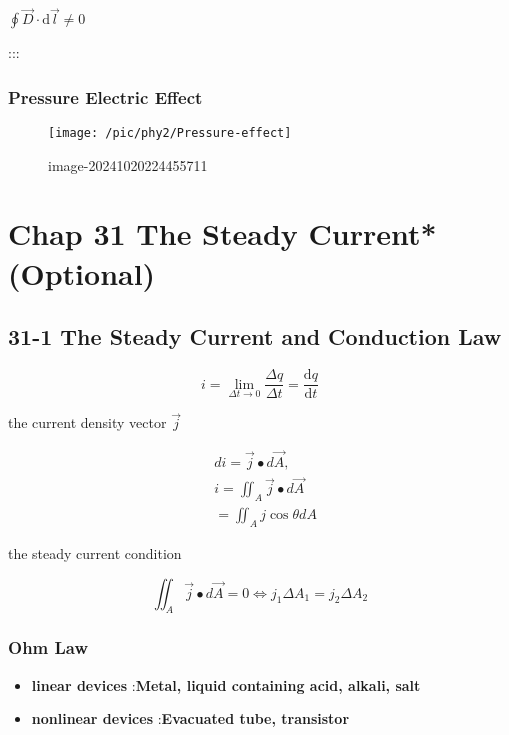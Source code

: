 \documentclass[
]{article}
\providecommand{\tightlist}{%
  \setlength{\itemsep}{0pt}\setlength{\parskip}{0pt}}
\begin{document}
\(\displaystyle \oint \vec D\cdot \mathrm d\vec l\neq 0\)

:::

\hypertarget{pressure-electric-effect}{%
\subsubsection{Pressure Electric
Effect}\label{pressure-electric-effect}}

\begin{figure}
\centering
\texttt{[image: /pic/phy2/Pressure-effect]}
\caption{image-20241020224455711}
\end{figure}

\hypertarget{chap-31-the-steady-currentoptional}{%
\section{Chap 31 The Steady
Current*(Optional)}\label{chap-31-the-steady-currentoptional}}

\hypertarget{the-steady-current-and-conduction-law}{%
\subsection{31-1 The Steady Current and Conduction
Law}\label{the-steady-current-and-conduction-law}}

\[
i=\lim _{\Delta t\to 0}\frac{\Delta q}{\Delta t}=\frac{\mathrm d q}{\mathrm d t}
\]

the current density vector \(\vec j\)

\[
\begin{aligned}&di=\vec{j}\bullet d\vec{A},\\&i=\iint_A\vec{j}\bullet d\vec{A}\\&=\iint_Aj\cos\theta dA\end{aligned}
\]

the steady current condition

\[
\iint_A\vec{j}\bullet d\vec{A}=0\Leftrightarrow j_1\Delta A_1=j_2\Delta A_2
\]

\hypertarget{ohm-law}{%
\subsubsection{Ohm Law}\label{ohm-law}}

\begin{itemize}
\tightlist
\item
  \textbf{linear devices} :\textbf{Metal, liquid containing acid,
  alkali, salt}
\item
  \textbf{nonlinear devices} :\textbf{Evacuated tube, transistor}
\end{itemize}
\end{document}
